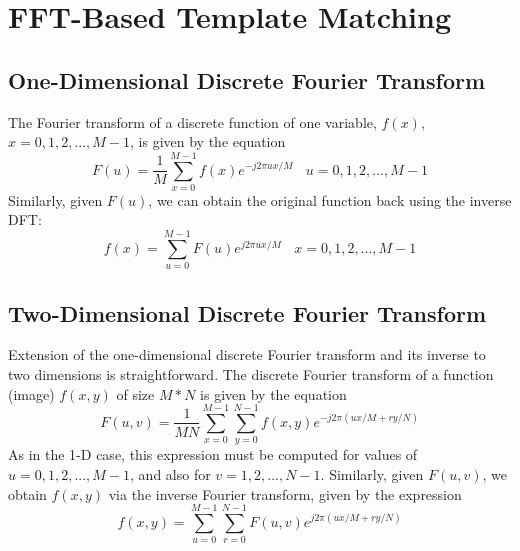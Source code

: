 \section{FFT-Based Template Matching}
\subsection{One-Dimensional Discrete Fourier Transform}
The Fourier transform of a discrete function of one variable, $f(x)$, $x = 0, 1, 2, ..., M-1$, is given by the equation
\begin{equation}
	F(u) = \frac{1}{M}\sum_{x = 0}^{M - 1} f(x) e^{-j2\pi ux/M} \ \ \ \ u = 0, 1, 2, ..., M-1
\end{equation}
Similarly, given $F(u)$, we can obtain the original function back using the inverse DFT:
\begin{equation}
	f(x) = \sum_{u = 0}^{M -1}F(u)e^{j2\pi ux /M} \ \ \ \ x = 0, 1, 2, ..., M - 1
\end{equation}
\subsection{Two-Dimensional Discrete Fourier Transform}
Extension of the one-dimensional discrete Fourier transform and its inverse to two dimensions is straightforward. The discrete Fourier transform of a function (image) $f(x, y)$ of size $M * N$ is given by the equation
\begin{equation}
	F(u, v) = \frac{1}{MN}\sum_{x = 0}^{M - 1}\sum_{y = 0}^{N - 1}f(x, y)e^{-j2\pi(ux/M + ry/N)}
\end{equation}
As in the 1-D case, this expression must be computed for values of $u = 0, 1, 2, ..., M -1 $, and also for $v = 1, 2, ..., N -1 $. Similarly, given $F(u, v)$, we obtain $f(x, y)$ via the inverse Fourier transform, given by the expression
\begin{equation}
	f(x, y) = \sum_{u = 0}^{M -1}\sum_{r = 0}^{N - 1} F(u, v)e^{j2\pi (ux/M + ry/N)}
\end{equation}

